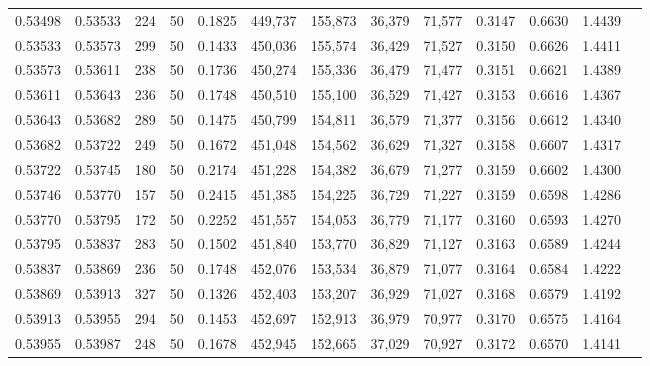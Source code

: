 \begin{tabular}{rrrrrrrrrrrrr}
0.53498 & 0.53533 &   224 &  50 &                                     0.1825 & 449,737 & 155,873 &  36,379 &  71,577 & 0.3147 & 0.6630 & 1.4439 \\
0.53533 & 0.53573 &   299 &  50 &                                     0.1433 & 450,036 & 155,574 &  36,429 &  71,527 & 0.3150 & 0.6626 & 1.4411 \\
0.53573 & 0.53611 &   238 &  50 &                                     0.1736 & 450,274 & 155,336 &  36,479 &  71,477 & 0.3151 & 0.6621 & 1.4389 \\
0.53611 & 0.53643 &   236 &  50 &                                     0.1748 & 450,510 & 155,100 &  36,529 &  71,427 & 0.3153 & 0.6616 & 1.4367 \\
0.53643 & 0.53682 &   289 &  50 &                                     0.1475 & 450,799 & 154,811 &  36,579 &  71,377 & 0.3156 & 0.6612 & 1.4340 \\
0.53682 & 0.53722 &   249 &  50 &                                     0.1672 & 451,048 & 154,562 &  36,629 &  71,327 & 0.3158 & 0.6607 & 1.4317 \\
0.53722 & 0.53745 &   180 &  50 &                                     0.2174 & 451,228 & 154,382 &  36,679 &  71,277 & 0.3159 & 0.6602 & 1.4300 \\
0.53746 & 0.53770 &   157 &  50 &                                     0.2415 & 451,385 & 154,225 &  36,729 &  71,227 & 0.3159 & 0.6598 & 1.4286 \\
0.53770 & 0.53795 &   172 &  50 &                                     0.2252 & 451,557 & 154,053 &  36,779 &  71,177 & 0.3160 & 0.6593 & 1.4270 \\
0.53795 & 0.53837 &   283 &  50 &                                     0.1502 & 451,840 & 153,770 &  36,829 &  71,127 & 0.3163 & 0.6589 & 1.4244 \\
0.53837 & 0.53869 &   236 &  50 &                                     0.1748 & 452,076 & 153,534 &  36,879 &  71,077 & 0.3164 & 0.6584 & 1.4222 \\
0.53869 & 0.53913 &   327 &  50 &                                     0.1326 & 452,403 & 153,207 &  36,929 &  71,027 & 0.3168 & 0.6579 & 1.4192 \\
0.53913 & 0.53955 &   294 &  50 &                                     0.1453 & 452,697 & 152,913 &  36,979 &  70,977 & 0.3170 & 0.6575 & 1.4164 \\
0.53955 & 0.53987 &   248 &  50 &                                     0.1678 & 452,945 & 152,665 &  37,029 &  70,927 & 0.3172 & 0.6570 & 1.4141 \\

\end{tabular}
